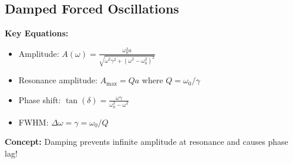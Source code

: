 \documentclass[11pt]{report}
\begin{document}
\subsection{Damped Forced Oscillations}

\begin{keybox}
\textbf{Key Equations:}
\begin{itemize}
    \item Amplitude: $A(\omega) = \frac{\omega_0^2 a}{\sqrt{\omega^2\gamma^2 + (\omega^2 - \omega_0^2)^2}}$
    \item Resonance amplitude: $A_{\text{max}} = Qa$ where $Q = \omega_0/\gamma$
    \item Phase shift: $\tan(\delta) = \frac{\omega\gamma}{\omega_0^2 - \omega^2}$
    \item FWHM: $\Delta\omega = \gamma = \omega_0/Q$
\end{itemize}
\textbf{Concept:} Damping prevents infinite amplitude at resonance and causes phase lag!
\end{keybox}
\end{document}
